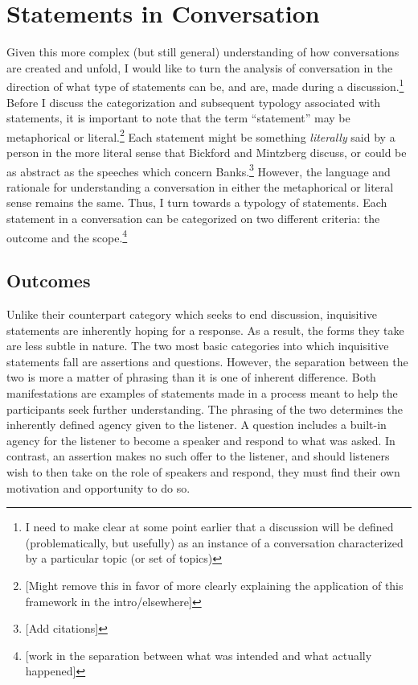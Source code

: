 \documentclass{article}
\begin{document}
\section{Statements in Conversation}
Given this more complex (but still general) understanding of how conversations are created and unfold, I would like to turn the analysis of conversation in the direction of what type of statements can be, and are, made during a discussion.\footnote{I need to make clear at some point earlier that a discussion will be defined (problematically, but usefully) as an instance of a conversation characterized by a particular topic (or set of topics)}
Before I discuss the categorization and subsequent typology associated with statements, it is important to note that the term ``statement'' may be metaphorical or literal.\footnote{[Might remove this in favor of more clearly explaining the application of this framework in the intro/elsewhere]}
Each statement might be something \emph{literally} said by a person in the more literal sense that Bickford and Mintzberg discuss, or could be as abstract as the speeches which concern Banks.\footnote{[Add citations]}
However, the language and rationale for understanding a conversation in either the metaphorical or literal sense remains the same.
Thus, I turn towards a typology of statements.
Each statement in a conversation can be categorized on two different criteria: the outcome and the scope.\footnote{[work in the separation between what was intended and what actually happened]}

\subsection{Outcomes}
Unlike their counterpart category which seeks to end discussion, inquisitive statements are inherently hoping for a response.
As a result, the forms they take are less subtle in nature.
The two most basic categories into which inquisitive statements fall are assertions and questions.
However, the separation between the two is more a matter of phrasing than it is one of inherent difference.
Both manifestations are examples of statements made in a process meant to help the participants seek further understanding.
The phrasing of the two determines the inherently defined agency given to the listener.
A question includes a built-in agency for the listener to become a speaker and respond to what was asked.
In contrast, an assertion makes no such offer to the listener, and should listeners wish to then take on the role of speakers and respond, they must find their own motivation and opportunity to do so.
\end{document}

